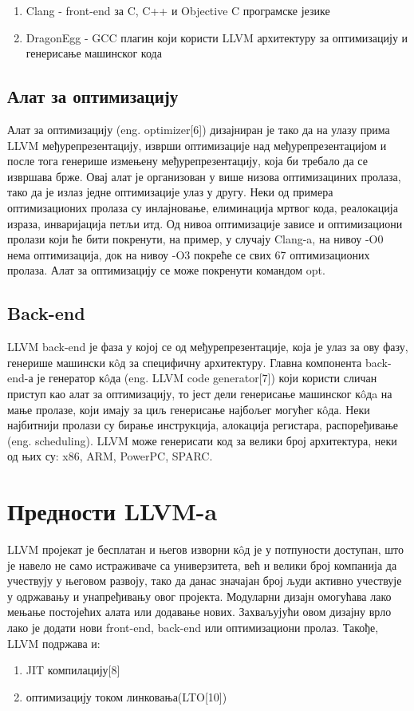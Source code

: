 \documentclass[12pt,oneside]{memoir}
\begin{document}
 \begin{enumerate}
 \item Clang - front-end за  C, C++ и Objective C програмске језике
 \item DragonEgg - GCC плагин који користи LLVM архитектуру за оптимизацију  
 				 и генерисање машинског кода
 \end{enumerate}

 \subsection{Алат за оптимизацију}
 Алат за оптимизацију (eng. optimizer[6]) дизајниран је тако да на улазу прима LLVM
 међурепрезентацију, изврши оптимизације над међурепрезентацијом и после тога генерише
 измењену међурепрезентацију, која би требало да се извршава брже.
 Овај алат је организован у више низова оптимизациних пролаза, тако да је излаз
 једне оптимизације улаз у другу.
 Неки од примера оптимизационих пролаза су инлајновање, елиминација мртвог кода,
 реалокација израза, инваријација петљи итд. 
 Од нивоа оптимизације зависе и оптимизациони пролази који ће бити покренути,
 на пример, у случају Clang-a, на нивоу -O0 нема оптимизација, док на нивоу
 -O3 покреће се свих 67 оптимизационих пролаза.
 Алат за оптимизацију се може покренути командом opt.

\subsection{Back-end} 
LLVM back-end је фаза у којој се од међурепрезентације, која је улаз за ову фазу,
генерише машински к\^{o}д за специфичну архитектуру.
Главна компонента back-end-а је генератор к\^{o}да (eng. LLVM code generator[7]) који
користи сличан приступ као алат за оптимизацију, то јест дели генерисање машинског
к\^{o}дa на мање пролазе, који имају за циљ генерисање најбољег могућег к\^{o}да.
Неки најбитнији пролази су бирање инструкција, алокација регистара, распоређивање
(eng. scheduling).
LLVM може генерисати код за велики број архитектура, неки од њих су: x86, ARM,
PowerPC, SPARC.

\section{Предности LLVM-a}

LLVM пројекат је бесплатан и његов изворни к\^{o}д је у потпуности доступан, 
што је навело не само истраживаче са универзитета, већ и велики број компанија 
да учествују у његовом развоју, тако да данас значајан број људи активно 
учествује у одржавању и унапређивању овог пројекта.
Модуларни дизајн омогућава лако мењање постојећих алата или додавање нових.
Захваљујући овом дизајну врло лако је додати нови front-end, back-end или
оптимизациони пролаз.
Такође, LLVM подржава и:
\begin{enumerate}
\item JIT компилацију[8]
\item оптимизацију током линковања(LTO[10])
\end{enumerate}
\end{document}
